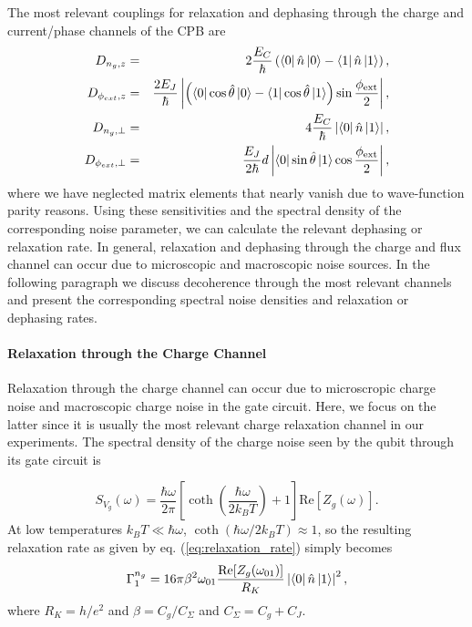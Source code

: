 %
The most relevant couplings for relaxation and dephasing through the charge and current/phase channels of the CPB are
%
\begin{eqnarray}
D_{n_g,z} & = & 2\frac{E_C}{\hbar}\left(\left< 0 \right|\hat{n}\left| 0 \right>-\left< 1 \right|\hat{n}\left| 1 \right>\right), \\
D_{\phi_{ext},z} & = & \frac{2 E_J}{\hbar}\left|\left(\left< 0 \right|\cos{\hat{\theta}}\left| 0 \right>-\left< 1 \right|\cos{\hat{\theta}}\left| 1 \right>\right)\sin{\frac{\phi_{\mathrm{ext}}}{2}}\right|, \\
D_{n_g,\perp} & = & 4\frac{E_C}{\hbar}\left|\left< 0 \right|\hat{n}\left| 1 \right>\right|, \\
D_{\phi_{ext},\perp} & = & \frac{E_J}{2\hbar}d\left|\left< 0 \right|\sin{\hat{\theta}}\left| 1 \right>\cos{\frac{\phi_{\mathrm{ext}}}{2}}\right|, \label{eq:flux_relaxation_sensitivity}
\end{eqnarray}
%
where we have neglected matrix elements that nearly vanish due to wave-function parity reasons. Using these sensitivities and the spectral density of the corresponding noise parameter, we can calculate the relevant dephasing or relaxation rate. In general, relaxation and dephasing through the charge and flux channel can occur due to microscopic and macroscopic noise sources. In the following paragraph we discuss decoherence through the most relevant channels and present the corresponding spectral noise densities and relaxation or dephasing rates.

\paragraph{Relaxation through the Charge Channel}

Relaxation through the charge channel can occur due to microscropic charge noise and macroscopic charge noise in the gate circuit. Here, we focus on the latter since it is usually the most relevant charge relaxation channel in our experiments. The spectral density of the charge noise seen by the qubit through its gate circuit is

%
\begin{equation}
S_{V_g}(\omega) = \frac{\hbar\omega}{2\pi}\left[\coth{\left(\frac{\hbar \omega}{2 k_B T}\right)}+1\right]\mathrm{Re}\left[Z_g(\omega)\right]. \label{eq:qubit_relaxation_svg}
\end{equation}
%
At low temperatures $k_B T \ll \hbar \omega$, $\coth{(\hbar\omega/2k_B T)}\approx 1$, so the resulting relaxation rate as given by eq. (\ref{eq:relaxation_rate}) simply becomes
%
\begin{equation}
\Gamma_1^{n_g} = 16\pi\beta^2\omega_{01}\frac{\mathrm{Re}[Z_g(\omega_{01})]}{R_K}\left|\left< 0 \right|\hat{n}\left| 1 \right>\right|^2, \label{eq:charge_relaxation_rate}
\end{equation}
%
where $R_K=h/e^2$ and $\beta=C_g/C_\Sigma$ and $C_\Sigma = C_g+C_J$.

